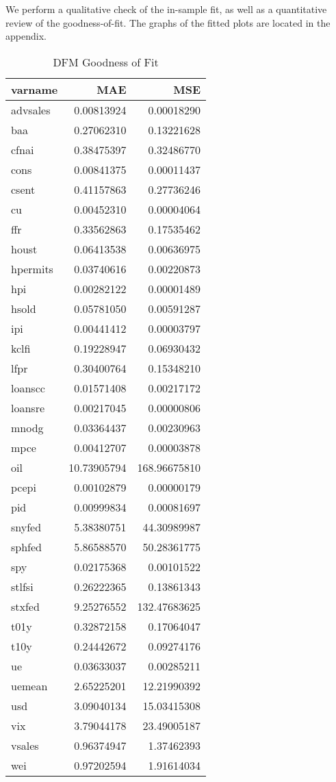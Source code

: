 \documentclass[11pt, letterpaper]{article}\usepackage[]{graphicx}\usepackage[]{color}
\begin{document}
We perform a qualitative check of the in-sample fit, as well as a quantitative review of the goodness-of-fit. The graphs of the fitted plots are located in the appendix.
\begin{table}[H]
\centering
\begingroup\footnotesize
\begin{tabular}{lrr}
  \hline
varname & MAE & MSE \\ 
  \hline
advsales & 0.00813924 & 0.00018290 \\ 
  baa & 0.27062310 & 0.13221628 \\ 
  cfnai & 0.38475397 & 0.32486770 \\ 
  cons & 0.00841375 & 0.00011437 \\ 
  csent & 0.41157863 & 0.27736246 \\ 
  cu & 0.00452310 & 0.00004064 \\ 
  ffr & 0.33562863 & 0.17535462 \\ 
  houst & 0.06413538 & 0.00636975 \\ 
  hpermits & 0.03740616 & 0.00220873 \\ 
  hpi & 0.00282122 & 0.00001489 \\ 
  hsold & 0.05781050 & 0.00591287 \\ 
  ipi & 0.00441412 & 0.00003797 \\ 
  kclfi & 0.19228947 & 0.06930432 \\ 
  lfpr & 0.30400764 & 0.15348210 \\ 
  loanscc & 0.01571408 & 0.00217172 \\ 
  loansre & 0.00217045 & 0.00000806 \\ 
  mnodg & 0.03364437 & 0.00230963 \\ 
  mpce & 0.00412707 & 0.00003878 \\ 
  oil & 10.73905794 & 168.96675810 \\ 
  pcepi & 0.00102879 & 0.00000179 \\ 
  pid & 0.00999834 & 0.00081697 \\ 
  snyfed & 5.38380751 & 44.30989987 \\ 
  sphfed & 5.86588570 & 50.28361775 \\ 
  spy & 0.02175368 & 0.00101522 \\ 
  stlfsi & 0.26222365 & 0.13861343 \\ 
  stxfed & 9.25276552 & 132.47683625 \\ 
  t01y & 0.32872158 & 0.17064047 \\ 
  t10y & 0.24442672 & 0.09274176 \\ 
  ue & 0.03633037 & 0.00285211 \\ 
  uemean & 2.65225201 & 12.21990392 \\ 
  usd & 3.09040134 & 15.03415308 \\ 
  vix & 3.79044178 & 23.49005187 \\ 
  vsales & 0.96374947 & 1.37462393 \\ 
  wei & 0.97202594 & 1.91614034 \\ 
   \hline
\end{tabular}
\endgroup
\caption{DFM Goodness of Fit} 
\end{table}
\end{document}
